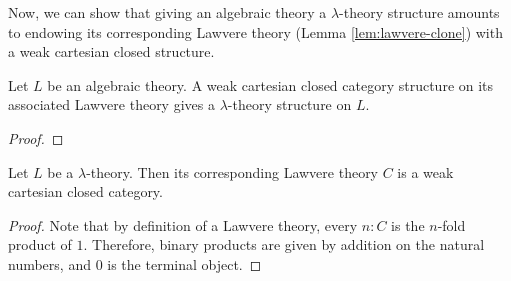 Now, we can show that giving an algebraic theory a $ \lambda $-theory structure amounts to endowing its corresponding Lawvere theory (Lemma \ref{lem:lawvere-clone}) with a weak cartesian closed structure.
\begin{lemma}
  Let $ L $ be an algebraic theory. A weak cartesian closed category structure on its associated Lawvere theory gives a $ \lambda $-theory structure on $ L $.
\end{lemma}
\begin{proof}
  \TODO
\end{proof}

\begin{lemma}
  Let $ L $ be a $ \lambda $-theory. Then its corresponding Lawvere theory $ C $ is a weak cartesian closed category.
\end{lemma}
\begin{proof}
  Note that by definition of a Lawvere theory, every $ n: C $ is the $ n $-fold product of $ 1 $. Therefore, binary products are given by addition on the natural numbers, and $ 0 $ is the terminal object.

  \TODO
\end{proof}

